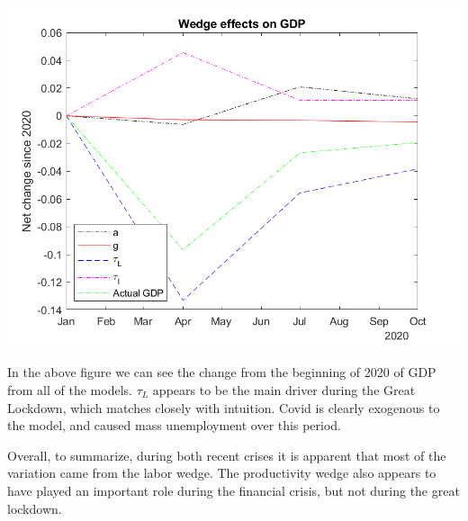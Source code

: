 \documentclass[11pt]{article} %
\begin{document}
\includegraphics{wedgescovdiff}

In the above figure we can see the change from the beginning of 2020 of GDP from all of the models. $\tau_L$ appears to be the main driver during the Great Lockdown, which matches closely with intuition. Covid is clearly exogenous to the model, and caused mass unemployment over this period.

Overall, to summarize, during both recent crises it is apparent that most of the variation came from the labor wedge. The productivity wedge also appears to have played an important role during the financial crisis, but not during the great lockdown. 

\end{document}
